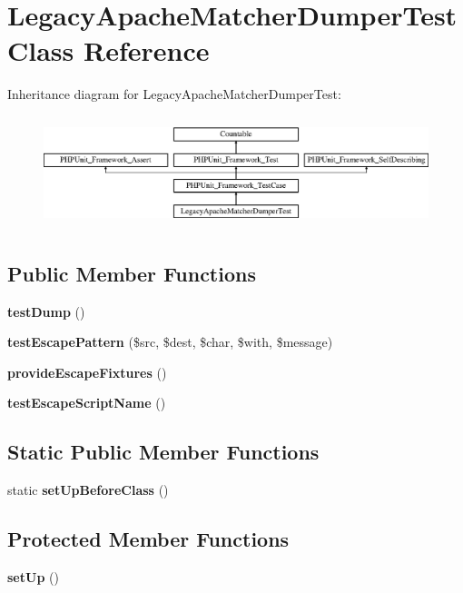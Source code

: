 \section{Legacy\+Apache\+Matcher\+Dumper\+Test Class Reference}
\label{class_symfony_1_1_component_1_1_routing_1_1_tests_1_1_matcher_1_1_dumper_1_1_legacy_apache_matcher_dumper_test}
Inheritance diagram for Legacy\+Apache\+Matcher\+Dumper\+Test\+:\begin{figure}[H]
\begin{center}
\leavevmode
\includegraphics[height=3.303835cm]{class_symfony_1_1_component_1_1_routing_1_1_tests_1_1_matcher_1_1_dumper_1_1_legacy_apache_matcher_dumper_test}
\end{center}
\end{figure}
\subsection*{Public Member Functions}
\begin{DoxyCompactItemize}
\item 
{\bf test\+Dump} ()
\item 
{\bf test\+Escape\+Pattern} (\$src, \$dest, \$char, \$with, \$message)
\item 
{\bf provide\+Escape\+Fixtures} ()
\item 
{\bf test\+Escape\+Script\+Name} ()
\end{DoxyCompactItemize}
\subsection*{Static Public Member Functions}
\begin{DoxyCompactItemize}
\item 
static {\bf set\+Up\+Before\+Class} ()
\end{DoxyCompactItemize}
\subsection*{Protected Member Functions}
\begin{DoxyCompactItemize}
\item 
{\bf set\+Up} ()
\end{DoxyCompactItemize}
